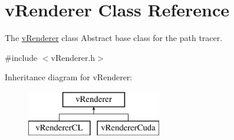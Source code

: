 \hypertarget{classvRenderer}{\section{v\-Renderer Class Reference}
\label{classvRenderer}
}


The \hyperlink{classvRenderer}{v\-Renderer} class Abstract base class for the path tracer.  




{\ttfamily \#include $<$v\-Renderer.\-h$>$}

Inheritance diagram for v\-Renderer\-:\begin{figure}[H]
\begin{center}
\leavevmode
\includegraphics[height=2.000000cm]{classvRenderer}
\end{center}
\end{figure}
